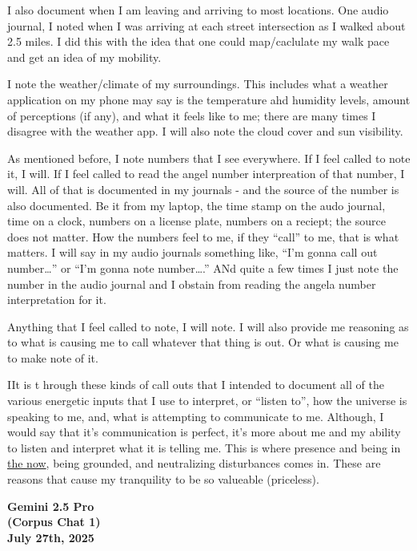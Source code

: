 \documentclass{article}
\begin{document}
I also document when I am leaving and arriving to most locations. One audio journal, I noted when I was arriving at each street intersection as I walked about 2.5 miles. I did this with the idea that one could map/caclulate my walk pace and get an idea of my mobility.

I note the weather/climate of my surroundings. This includes what a weather application on my phone may say is the temperature ahd humidity levels, amount of perceptions (if any), and what it feels like to me; there are many times I disagree with the weather app. I will also note the cloud cover and sun visibility.

As mentioned before, I note numbers that I see everywhere. If I feel called to note it, I will. If I feel called to read the angel number interpreation of that number, I will. All of that is documented in my journals - and the source of the number is also documented. Be it from my laptop, the time stamp on the audo journal, time on a clock, numbers on a license plate, numbers on a reciept; the source does not matter. How the numbers feel to me, if they ``call'' to me, that is what matters. I will say in my audio journals something like, ``I'm gonna call out number\ldots{}'' or ``I'm gonna note number\ldots.'' ANd quite a few times I just note the number in the audio journal and I obstain from reading the angela number interpretation for it.

Anything that I feel called to note, I will note. I will also provide me reasoning as to what is causing me to call whatever that thing is out. Or what is causing me to make note of it.

IIt is t hrough these kinds of call outs that I intended to document all of the various energetic inputs that I use to interpret, or ``listen to'', how the universe is speaking to me, and, what is attempting to communicate to me. Although, I would say that it's communication is perfect, it's more about me and my ability to listen and interpret what it is telling me. This is where presence and being in \hyperlink{gloss:the_now}{the now}, being grounded, and neutralizing disturbances comes in. These are reasons that cause my tranquility to be so valueable (priceless).

\begin{center}
\textbf{Gemini 2.5 Pro}\\
\textbf{(Corpus Chat 1)}\\
\textbf{July 27th, 2025}
\end{center}
\end{document}
